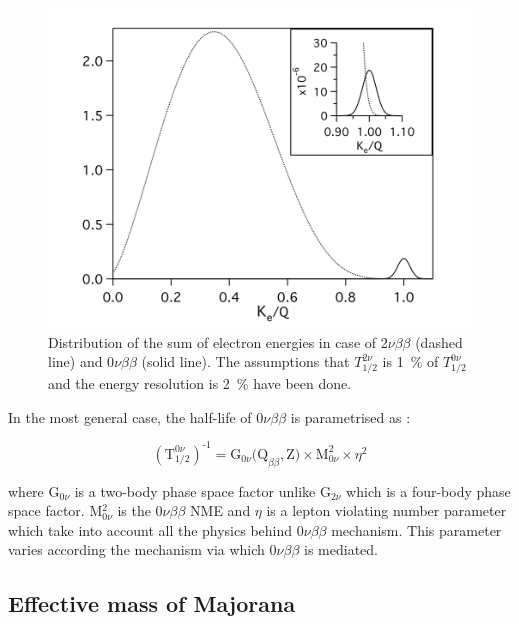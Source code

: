 \documentclass[main.tex]{subfiles}
\begin{document}
\begin{figure}[h!]
\begin{center}
\includegraphics[scale=0.65]{pictures/Chap2/bbspectra.jpg}
\caption{Distribution of the sum of electron energies in case of 2$\nu\beta\beta$ (dashed line) and 0$\nu\beta\beta$ (solid line). The assumptions that $T_{\text{1/2}}^{\text{2}\nu}$ is 1~\% of $T_{\text{1/2}}^{\text{0}\nu}$ and the energy resolution is 2~\% have been done.}
\label{bbDecaySpectrum}
\end{center}
\end{figure}


\NI In the most general case, the half-life of 0$\nu\beta\beta$ is parametrised as : 


\begin{equation}
(\text{T}_{\text{1/2}}^{\text{0}\nu})^{\text{-1}} = \text{G}_{\text{0}\nu}\text{(Q}_{\beta\beta},\text{Z)} \times \text{M}^\text{2}_{\text{0}\nu} \times \eta^\text{2}
\end{equation}


\bigskip


\NI where G$_{\text{0}\nu}$ is a two-body phase space factor unlike G$_{\text{2}\nu}$ which is a four-body phase space factor. M$^\text{2}_{\text{0}\nu}$ is the 0$\nu\beta\beta$ NME and $\eta$ is a lepton violating number parameter which take into account all the physics behind 0$\nu\beta\beta$ mechanism. This parameter varies according the mechanism via which 0$\nu\beta\beta$ is mediated.  


\bigskip


\NI


\subsection{Effective mass of Majorana}
\end{document}
